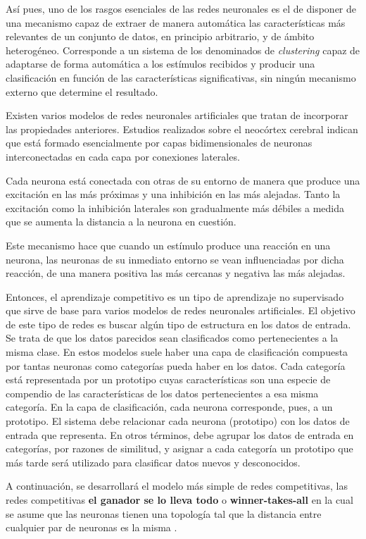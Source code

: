 Así pues, uno de los rasgos esenciales de las redes neuronales es el de disponer de una mecanismo capaz de extraer de manera automática las características más relevantes de un conjunto de datos, en principio arbitrario, y de ámbito heterogéneo. Corresponde a un sistema de los denominados de \textit{clustering} capaz de adaptarse de forma automática a los estímulos recibidos y producir una clasificación en función de las características significativas, sin ningún mecanismo externo que determine el resultado.

Existen varios modelos de redes neuronales artificiales que tratan de incorporar las propiedades anteriores. Estudios realizados sobre el neocórtex cerebral indican que está formado esencialmente por capas bidimensionales de neuronas interconectadas en cada capa por conexiones laterales.

Cada neurona está conectada con otras de su entorno de manera que produce una excitación en las más próximas y una inhibición en las más alejadas. Tanto la excitación como la inhibición laterales son gradualmente más débiles a medida que se aumenta la distancia a la neurona en cuestión.

Este mecanismo hace que cuando un estímulo produce una reacción en una neurona, las neuronas de su inmediato entorno se vean influenciadas por dicha reacción, de una manera positiva las más cercanas y negativa las más alejadas. 

Entonces, el aprendizaje competitivo es un tipo de aprendizaje no supervisado que sirve de base para varios modelos de redes neuronales artificiales. El objetivo de este tipo de redes es buscar algún tipo de estructura en los datos de entrada. Se trata de que los datos parecidos sean clasificados como pertenecientes a la misma clase. En estos modelos suele haber una capa de clasificación compuesta por tantas neuronas como categorías pueda haber en los datos. Cada categoría está representada por un prototipo cuyas características son una especie de compendio de las características de los datos pertenecientes a esa misma categoría.  En la capa de clasificación, cada neurona corresponde, pues, a un prototipo. El sistema debe relacionar cada neurona (prototipo) con los datos de entrada que representa. En otros términos, debe agrupar los datos de entrada en categorías, por razones de similitud, y asignar a cada categoría un prototipo que más tarde será utilizado para clasificar datos nuevos y desconocidos.

A continuación, se desarrollará el modelo más simple de redes competitivas, las redes competitivas \textbf{el ganador se lo lleva todo} o \textbf{winner-takes-all} en la cual se asume que las neuronas tienen una topología tal que la distancia entre cualquier par de neuronas es la misma \cite{rumelhart1985feature}.


